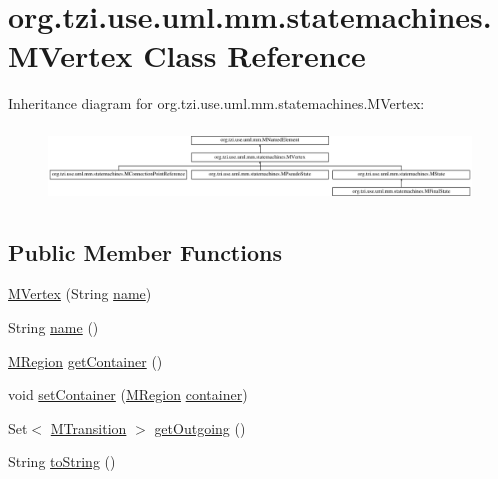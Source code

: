 \hypertarget{classorg_1_1tzi_1_1use_1_1uml_1_1mm_1_1statemachines_1_1_m_vertex}{\section{org.\-tzi.\-use.\-uml.\-mm.\-statemachines.\-M\-Vertex Class Reference}
\label{classorg_1_1tzi_1_1use_1_1uml_1_1mm_1_1statemachines_1_1_m_vertex}
}
Inheritance diagram for org.\-tzi.\-use.\-uml.\-mm.\-statemachines.\-M\-Vertex\-:\begin{figure}[H]
\begin{center}
\leavevmode
\includegraphics[height=2.001787cm]{classorg_1_1tzi_1_1use_1_1uml_1_1mm_1_1statemachines_1_1_m_vertex}
\end{center}
\end{figure}
\subsection*{Public Member Functions}
\begin{DoxyCompactItemize}
\item 
\hyperlink{classorg_1_1tzi_1_1use_1_1uml_1_1mm_1_1statemachines_1_1_m_vertex_ab930ac61d49df508741af197abc48f3d}{M\-Vertex} (String \hyperlink{classorg_1_1tzi_1_1use_1_1uml_1_1mm_1_1statemachines_1_1_m_vertex_a9bb884a76140732039ff1fbf631b6575}{name})
\item 
String \hyperlink{classorg_1_1tzi_1_1use_1_1uml_1_1mm_1_1statemachines_1_1_m_vertex_a2bc3145040e508bd152d95d57af74b71}{name} ()
\item 
\hyperlink{classorg_1_1tzi_1_1use_1_1uml_1_1mm_1_1statemachines_1_1_m_region}{M\-Region} \hyperlink{classorg_1_1tzi_1_1use_1_1uml_1_1mm_1_1statemachines_1_1_m_vertex_afbc4cf07c492b77cb4deffa560f6a31d}{get\-Container} ()
\item 
void \hyperlink{classorg_1_1tzi_1_1use_1_1uml_1_1mm_1_1statemachines_1_1_m_vertex_a18042fbb8ebdab35a440e625dbb4eed4}{set\-Container} (\hyperlink{classorg_1_1tzi_1_1use_1_1uml_1_1mm_1_1statemachines_1_1_m_region}{M\-Region} \hyperlink{classorg_1_1tzi_1_1use_1_1uml_1_1mm_1_1statemachines_1_1_m_vertex_a6fac4b2809015693c6c39f1f874970aa}{container})
\item 
Set$<$ \hyperlink{classorg_1_1tzi_1_1use_1_1uml_1_1mm_1_1statemachines_1_1_m_transition}{M\-Transition} $>$ \hyperlink{classorg_1_1tzi_1_1use_1_1uml_1_1mm_1_1statemachines_1_1_m_vertex_a6e17cda479a471de4ada8621df5e1223}{get\-Outgoing} ()
\item 
String \hyperlink{classorg_1_1tzi_1_1use_1_1uml_1_1mm_1_1statemachines_1_1_m_vertex_ab8ec1236ed7f0fdea3bf97b493828db6}{to\-String} ()
\end{DoxyCompactItemize}
